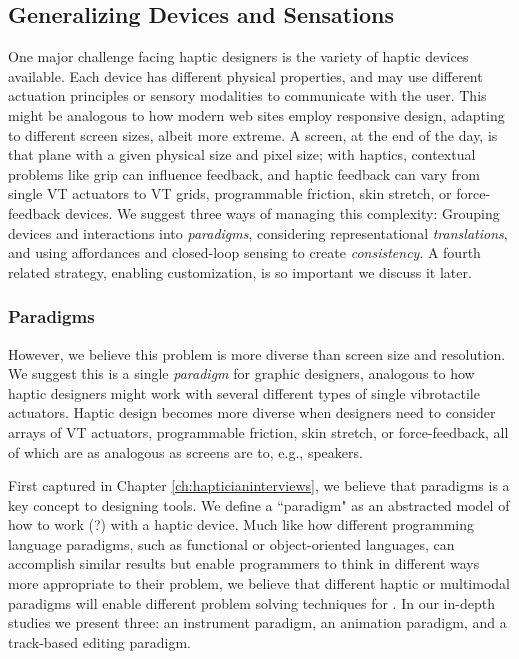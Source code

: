 \subsection{Generalizing Devices and Sensations}
One major challenge facing haptic designers is the variety of haptic devices available.
Each device has different physical properties, and may use different actuation principles or sensory modalities to communicate with the user.
This might be analogous to how modern web sites employ responsive design, adapting to different screen sizes, albeit more extreme.
A screen, at the end of the day, is that plane with a given physical size and pixel size; with haptics,
contextual problems like grip can influence feedback, and haptic feedback can vary from single VT actuators to VT grids, programmable friction, skin stretch, or force-feedback devices.
We suggest three ways of managing this complexity:
Grouping devices and interactions into \emph{paradigms},
considering representational \emph{translations}, and
using affordances and closed-loop sensing to create \emph{consistency}.
A fourth related strategy, enabling customization, is so important we discuss it later.


\subsubsection{Paradigms}
However, we believe this problem is more diverse than screen size and resolution.
We suggest this is a single \emph{paradigm} for graphic designers, analogous to how haptic designers might work with several different types of single vibrotactile actuators.
Haptic design becomes more diverse when designers need to consider arrays of VT actuators, programmable friction, skin stretch, or force-feedback, all of which are as analogous as screens are to, e.g., speakers.

First captured in Chapter \ref{ch:hapticianinterviews}, we believe that paradigms is a key concept to designing \haxd tools.
We define a ``paradigm" as an abstracted model of how to work (?) with a haptic device.
Much like how different programming language paradigms, such as functional or object-oriented languages, can accomplish similar results but enable programmers to think in different ways more appropriate to their problem, we believe that different haptic or multimodal paradigms will enable different problem solving techniques for \haxd.
In our in-depth studies we present three: an instrument paradigm, an animation paradigm, and a track-based editing paradigm.

